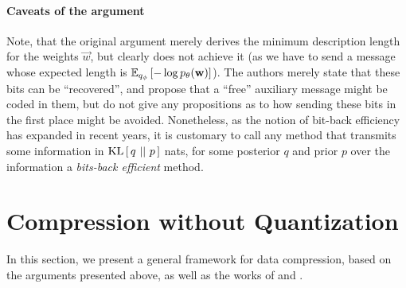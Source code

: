\paragraph{Caveats of the argument}
Note, that the original argument merely derives the minimum description length
for the weights $\vec{w}$, but clearly does not achieve it (as we have to send a
message whose expected length is $\Exp{-\log p_\theta(\vec{w})}{q_\phi}$). The
authors merely state that these bits can be ``recovered'', and propose that a
``free'' auxiliary message might be coded in them, but do not give any
propositions as to how sending these bits in the first place might be avoided.
Nonetheless, as the notion of bit-back efficiency has expanded in recent years,
it is customary to call any method that transmits some information in
$\KL{q}{p}$ nats, for some posterior $q$ and prior $p$ over the information a
\textit{bits-back efficient} method.

\section{Compression without Quantization}
\par
In this section, we present a general framework for data compression, based on
the arguments presented above, as well as the works of
\cite{harsha2007communication} and \cite{havasi2018minimal}. 

